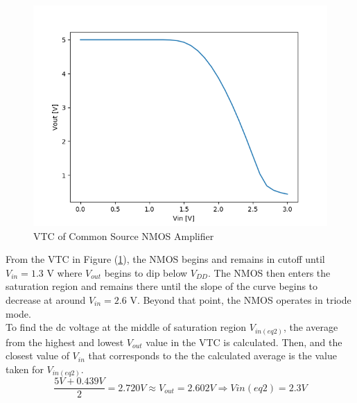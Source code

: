 \begin{figure}[h!]
	\centering
	\includegraphics[scale=0.75]{../images/sim2_vtc.PNG}
	\caption{VTC of Common Source NMOS Amplifier}
	\label{fig:part2_vtc}
\end{figure}

\FloatBarrier

\begin{table}[h!]
	\centering
	\caption{Figure (\ref{fig:part2_vtc}) Data}
	\label{tab:part2_vtc}
\end{table}

\FloatBarrier

From the VTC in Figure (\ref{fig:part2_vtc}), the NMOS begins and remains in cutoff until $V_{in} = 1.3$ \si{\volt} where $V_{out}$ begins to dip below $V_{DD}$.
The NMOS then enters the saturation region and remains there until the slope of the curve begins to decrease at around $V_{in} = 2.6$ \si{\volt}.
Beyond that point, the NMOS operates in triode mode. \\

To find the dc voltage at the middle of saturation region $V_{in(eq2)}$, the average from the highest and lowest $V_{out}$ value in the VTC is calculated.
Then, and the closest value of $V_{in}$ that corresponds to the the calculated average is the value taken for $V_{in(eq2)}$. \\

\begin{equation}
	\label{eq:v_in_eq2}
	\frac{5 V + 0.439 V}{2} = 2.720 V \approx V_{out} = 2.602 V \Rightarrow V{in(eq2)} = 2.3 V
\end{equation}

